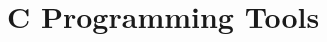 \documentclass[../main.tex]{subfiles}
\begin{document}
\clearpage
\thispagestyle{empty}
\vspace*{7cm}
\section{C Programming Tools}
\vspace*{1.5cm}
\end{document}
